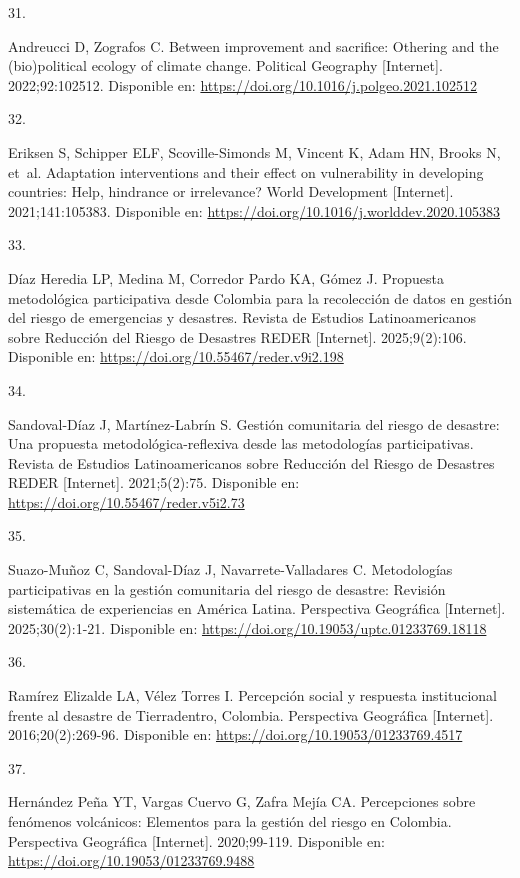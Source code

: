 \documentclass[
  spanish,
  letterpaper,
]{book}
\newlength{\cslhangindent}
\newlength{\csllabelwidth}
\newenvironment{CSLReferences}[2] %
 {\begin{list}{}{%
  \setlength{\itemindent}{0pt}
  \setlength{\leftmargin}{0pt}
  \setlength{\parsep}{0pt}
  \ifodd #1
   \setlength{\leftmargin}{\cslhangindent}
   \setlength{\itemindent}{-1\cslhangindent}
  \fi
  \setlength{\itemsep}{#2\baselineskip}}}
 {\end{list}}
\newcommand{\CSLLeftMargin}[1]{\parbox[t]{\csllabelwidth}{\strut#1\strut}}
\newcommand{\CSLRightInline}[1]{\parbox[t]{\linewidth - \csllabelwidth}{\strut#1\strut}}
\begin{document}
\begin{CSLReferences}{0}{1}
\CSLLeftMargin{31. }%
\CSLRightInline{Andreucci D, Zografos C. Between improvement and
sacrifice: Othering and the (bio)political ecology of climate change.
Political Geography {[}Internet{]}. 2022;92:102512. Disponible en:
\url{https://doi.org/10.1016/j.polgeo.2021.102512}}

\CSLLeftMargin{32. }%
\CSLRightInline{Eriksen S, Schipper ELF, Scoville-Simonds M, Vincent K,
Adam HN, Brooks N, et~al. Adaptation interventions and their effect on
vulnerability in developing countries: Help, hindrance or irrelevance?
World Development {[}Internet{]}. 2021;141:105383. Disponible en:
\url{https://doi.org/10.1016/j.worlddev.2020.105383}}

\CSLLeftMargin{33. }%
\CSLRightInline{Díaz Heredia LP, Medina M, Corredor Pardo KA, Gómez J.
Propuesta metodológica participativa desde Colombia para la recolección
de datos en gestión del riesgo de emergencias y desastres. Revista de
Estudios Latinoamericanos sobre Reducción del Riesgo de Desastres REDER
{[}Internet{]}. 2025;9(2):106. Disponible en:
\url{https://doi.org/10.55467/reder.v9i2.198}}

\CSLLeftMargin{34. }%
\CSLRightInline{Sandoval-Díaz J, Martínez-Labrín S. Gestión comunitaria
del riesgo de desastre: Una propuesta metodológica-reflexiva desde las
metodologías participativas. Revista de Estudios Latinoamericanos sobre
Reducción del Riesgo de Desastres REDER {[}Internet{]}. 2021;5(2):75.
Disponible en: \url{https://doi.org/10.55467/reder.v5i2.73}}

\CSLLeftMargin{35. }%
\CSLRightInline{Suazo-Muñoz C, Sandoval-Díaz J, Navarrete-Valladares C.
Metodologías participativas en la gestión comunitaria del riesgo de
desastre: Revisión sistemática de experiencias en América Latina.
Perspectiva Geográfica {[}Internet{]}. 2025;30(2):1-21. Disponible en:
\url{https://doi.org/10.19053/uptc.01233769.18118}}

\CSLLeftMargin{36. }%
\CSLRightInline{Ramírez Elizalde LA, Vélez Torres I. Percepción social y
respuesta institucional frente al desastre de Tierradentro, Colombia.
Perspectiva Geográfica {[}Internet{]}. 2016;20(2):269-96. Disponible en:
\url{https://doi.org/10.19053/01233769.4517}}

\CSLLeftMargin{37. }%
\CSLRightInline{Hernández Peña YT, Vargas Cuervo G, Zafra Mejía CA.
Percepciones sobre fenómenos volcánicos: Elementos para la gestión del
riesgo en Colombia. Perspectiva Geográfica {[}Internet{]}. 2020;99-119.
Disponible en: \url{https://doi.org/10.19053/01233769.9488}}


\end{CSLReferences}
\end{document}
